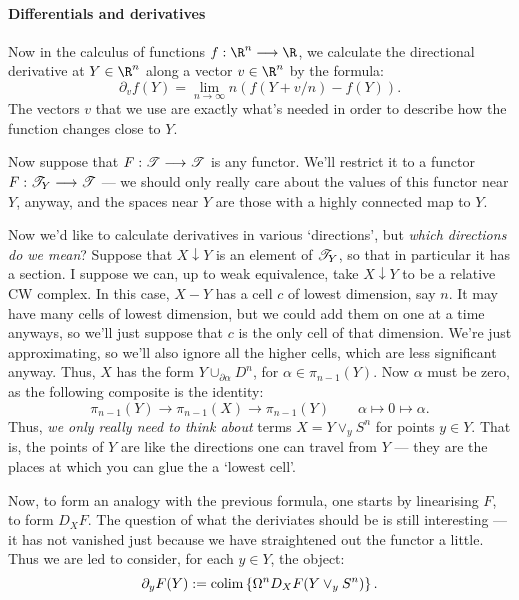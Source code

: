 \documentclass[11pt]{article}
\begin{document}
\begin{shaded}
\paragraph*{Differentials and derivatives}
Now in the calculus of functions $f:\R^n\to \R$, we calculate the directional derivative at $Y\in\R^n$ along a vector $v\in\R^n$ by the formula:
\[\partial_vf(Y)=\lim_{n\rightarrow\infty} n\left(f(Y+v/n)-f(Y)\right).\]
The vectors $v$ that we use are exactly what's needed in order to describe how the function changes close to $Y$.

Now suppose that $F:\mathscr{T}\longrightarrow\mathscr{T}$ is any functor. We'll restrict it to a functor $F:\mathscr{T}_Y\longrightarrow\mathscr{T}$ --- we should only really care about the values of this functor near $Y$, anyway, and the spaces near $Y$ are those with a highly connected map to $Y$.

Now we'd like to calculate derivatives in various `directions', but \emph{which directions do we mean}? Suppose that $X\downarrow Y$ is an element of $\mathscr{T}_Y$, so that in particular it has a section. I suppose we can, up to weak equivalence, take $X\downarrow Y$ to be a relative CW complex. In this case, $X-Y$ has a cell $c$ of lowest dimension, say $n$. It may have many cells of lowest dimension, but we could add them on one at a time anyways, so we'll just suppose that $c$ is the only cell of that dimension. We're just approximating, so we'll also ignore all the higher cells, which are less significant anyway. Thus, $X$ has the form $Y\cup_{\partial \alpha}D^n$, for $\alpha\in\pi_{n-1}(Y)$. Now $\alpha$ must be zero, as the following composite is the identity:
\[\pi_{n-1}(Y)\to \pi_{n-1}(X)\to \pi_{n-1}(Y)\qquad \alpha\mapsto0\mapsto\alpha.\]
Thus, \emph{we only really need to think about} terms $X=Y\vee _yS^n$ for points $y\in Y$. That is, the points of $Y$ are like the directions one can travel from $Y$ --- they are the places at which you can glue the a `lowest cell'.

Now, to form an analogy with the previous formula, one starts by linearising $F$, to form $D_XF$. The question of what the deriviates should be is still interesting --- it has not vanished just because we have straightened out the functor a little. Thus we are led to consider, for each $y\in Y$, the object:
\[\partial_yF(Y):=\operatorname*{colim} \left\{\Omega^nD_XF(Y\vee _yS^n)\right\}.\]
%
%
%
%
%
\end{shaded}
\end{document}
